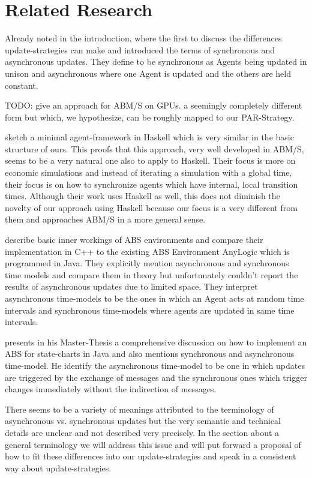 \section{Related Research}
Already noted in the introduction, \cite{huberman_evolutionary_1993} where the first to discuss the differences update-strategies can make and introduced the terms of synchronous and asynchronous updates. They define to be synchronous as Agents being updated in unison and asynchronous where one Agent is updated and the others are held constant.

\medskip

TODO: \cite{a_framework_2008} give an approach for ABM/S on GPUs. a seemingly completely different form but which, we hypothesize, can be roughly mapped to our PAR-Strategy. 
	
\medskip
	
\cite{botta_time_2010} sketch a minimal agent-framework in Haskell which is very similar in the basic structure of ours. This proofs that this approach, very well developed in ABM/S, seems to be a very natural one also to apply to Haskell. Their focus is more on economic simulations and instead of iterating a simulation with a global time, their focus is on how to synchronize agents which have internal, local transition times. Although their work uses Haskell as well, this does not diminish the novelty of our approach using Haskell because our focus is a very different from them and approaches ABM/S in a more general sense.

\medskip

\cite{dawson_opening_2014} describe basic inner workings of ABS environments and compare their implementation in C++ to the existing ABS Environment AnyLogic which is programmed in Java. They explicitly mention asynchronous and synchronous time models and compare them in theory but unfortunately couldn't report the results of asynchronous updates due to limited space. They interpret asynchronous time-models to be the ones in which an Agent acts at random time intervals and synchronous time-models where agents are updated in same time intervals.

\medskip

\cite{yuxuan_agent-based_2016} presents in his Master-Thesis a comprehensive discussion on how to implement an ABS for state-charts in Java and also mentions synchronous and asynchronous time-model. He identify the asynchronous time-model to be one in which updates are triggered by the exchange of messages and the synchronous ones which trigger changes immediately without the indirection of messages.

\medskip

There seems to be a variety of meanings attributed to the terminology of asynchronous vs. synchronous updates but the very semantic and technical details are unclear and not described very precisely. In the section about a general terminology we will address this issue and will put forward a proposal of how to fit these differences into our update-strategies and speak in a consistent way about update-strategies.